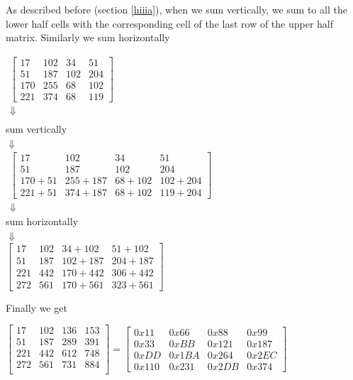       As described before (section \ref{hiiia}), when we sum vertically, we sum to all the lower half cells with the corresponding cell of the last row of the upper half matrix. Similarly we sum horizontally
      \begin{center}
      	$  \begin{matrix}
      	
      	\begin{bmatrix}
      	17 &102 & 34 & 51\\
      	51 &187 &102&204\\
      	170&255&68&102\\
      	221&374&68&119
      	\end{bmatrix}\\
      	\Downarrow\\
       	\end{matrix}$\\
       	sum vertically\\
       	$ \Downarrow $\\
       	$\begin{matrix}
       	
      	\begin{bmatrix}
      	17 &102 & 34 & 51\\
      	51 &187 &102&204\\
      	170+51&255+187&68+102&102+204\\
      	221+51&374+187&68+102&119+204
      	\end{bmatrix}
      	\\\Downarrow
      	\end{matrix}$\\
      	sum horizontally\\
      	$ \Downarrow $\\$
      	\begin{bmatrix}
      	17 &102 & 34+102 & 51+102\\
      	51 &187 &102+187&204+187\\
      	221&442&170+442&306+442\\
      	272&561&170+561&323+561
      	\end{bmatrix}$
      \end{center}
      \bigskip
      Finally we get        
     \begin{center}
     	$ \begin{bmatrix}
     	17&   102&   136&   153\\
     	51 &  187 &  289 &  391\\
     	221  & 442  & 612  & 748\\
     	272   &561   &731   &884\\
     	\end{bmatrix}=
     	\begin{bmatrix}
     	0x11 & 0x66 & 0x88 & 0x99\\
     	0x33 & 0xBB & 0x121 & 0x187   	\\
     	0xDD&0x1BA & 0x264  &  0x2EC \\
     	0x110& 0x231 & 0x2DB & 0x374
     	\end{bmatrix}$
     \end{center}
